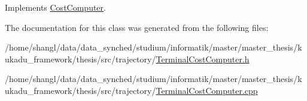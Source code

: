\-Implements \hyperlink{classCostComputer_a139032631f2d4bd1882d9e5e47960eb0}{\-Cost\-Computer}.



\-The documentation for this class was generated from the following files\-:\begin{DoxyCompactItemize}
\item 
/home/shangl/data/data\-\_\-synched/studium/informatik/master/master\-\_\-thesis/kukadu\-\_\-framework/thesis/src/trajectory/\hyperlink{TerminalCostComputer_8h}{\-Terminal\-Cost\-Computer.\-h}\item 
/home/shangl/data/data\-\_\-synched/studium/informatik/master/master\-\_\-thesis/kukadu\-\_\-framework/thesis/src/trajectory/\hyperlink{TerminalCostComputer_8cpp}{\-Terminal\-Cost\-Computer.\-cpp}\end{DoxyCompactItemize}
